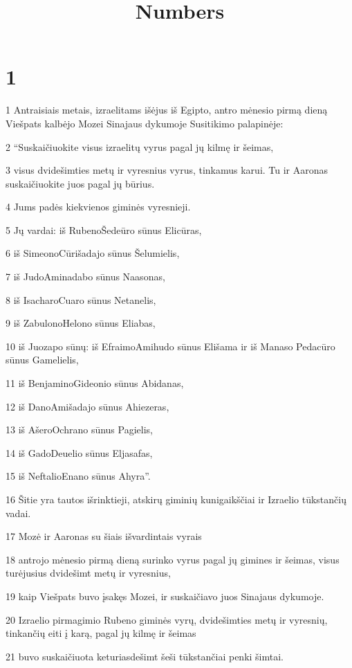 

\title{Numbers}

\chapter{1}


\par 1 Antraisiais metais, izraelitams išėjus iš Egipto, antro mėnesio pirmą dieną Viešpats kalbėjo Mozei Sinajaus dykumoje Susitikimo palapinėje: 
\par 2 “Suskaičiuokite visus izraelitų vyrus pagal jų kilmę ir šeimas, 
\par 3 visus dvidešimties metų ir vyresnius vyrus, tinkamus karui. Tu ir Aaronas suskaičiuokite juos pagal jų būrius. 
\par 4 Jums padės kiekvienos giminės vyresnieji. 
\par 5 Jų vardai: iš Rubeno­Šedeūro sūnus Elicūras, 
\par 6 iš Simeono­Cūrišadajo sūnus Šelumielis, 
\par 7 iš Judo­Aminadabo sūnus Naasonas, 
\par 8 iš Isacharo­Cuaro sūnus Netanelis, 
\par 9 iš Zabulono­Helono sūnus Eliabas, 
\par 10 iš Juozapo sūnų: iš Efraimo­Amihudo sūnus Elišama ir iš Manaso­ Pedacūro sūnus Gamelielis, 
\par 11 iš Benjamino­Gideonio sūnus Abidanas, 
\par 12 iš Dano­Amišadajo sūnus Ahiezeras, 
\par 13 iš Ašero­Ochrano sūnus Pagielis, 
\par 14 iš Gado­Deuelio sūnus Eljasafas, 
\par 15 iš Neftalio­Enano sūnus Ahyra”. 
\par 16 Šitie yra tautos išrinktieji, atskirų giminių kunigaikščiai ir Izraelio tūkstančių vadai. 
\par 17 Mozė ir Aaronas su šiais išvardintais vyrais 
\par 18 antrojo mėnesio pirmą dieną surinko vyrus pagal jų gimines ir šeimas, visus turėjusius dvidešimt metų ir vyresnius, 
\par 19 kaip Viešpats buvo įsakęs Mozei, ir suskaičiavo juos Sinajaus dykumoje. 
\par 20 Izraelio pirmagimio Rubeno giminės vyrų, dvidešimties metų ir vyresnių, tinkančių eiti į karą, pagal jų kilmę ir šeimas 
\par 21 buvo suskaičiuota keturiasdešimt šeši tūkstančiai penki šimtai. 
